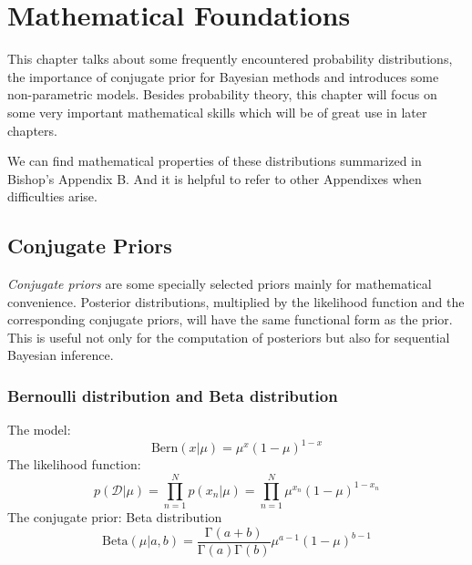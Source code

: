 \documentclass[a4paper]{report}
\newcommand{\up}{\mathrm}
\renewcommand{\cal}{\mathcal}
\newcommand{\imp}[1]{{\color{blue}\textit{#1}}}
\begin{document}
\chapter{Mathematical Foundations}
This chapter talks about some frequently encountered probability distributions, the importance of conjugate prior for Bayesian methods and introduces some non-parametric models. Besides probability theory, this chapter will focus on some very important mathematical skills which will be of great use in later chapters.

We can find mathematical properties of these distributions summarized in Bishop's Appendix B. And it is helpful to refer to other Appendixes when difficulties arise.
\section{Conjugate Priors}
\imp{Conjugate priors} are some specially selected priors mainly for mathematical convenience. Posterior distributions, multiplied by the likelihood function and the corresponding conjugate priors, will have the same functional form as the prior. This is useful not only for the computation of posteriors but also for sequential Bayesian inference.
\subsection{Bernoulli distribution and Beta distribution}
The model:
\begin{equation}
	\mathrm{Bern}(x|\mu)=\mu^{x}(1-\mu)^{1-x}
\end{equation}
The likelihood function:
\begin{equation}
	p(\cal{D}|\mu) = \prod_{n=1}^{N} p(x_n|\mu)=\prod_{n=1}^{N}\mu^{x_n}(1-\mu)^{1-x_n}
\end{equation}
The conjugate prior: Beta distribution
\begin{equation}
	\mathrm{Beta}(\mu|a,b)=\frac{\up{\Gamma}(a+b)}{\up{\Gamma}(a)\up{\Gamma}(b)}\mu^{a-1}(1-\mu)^{b-1}
\end{equation}
\end{document}

